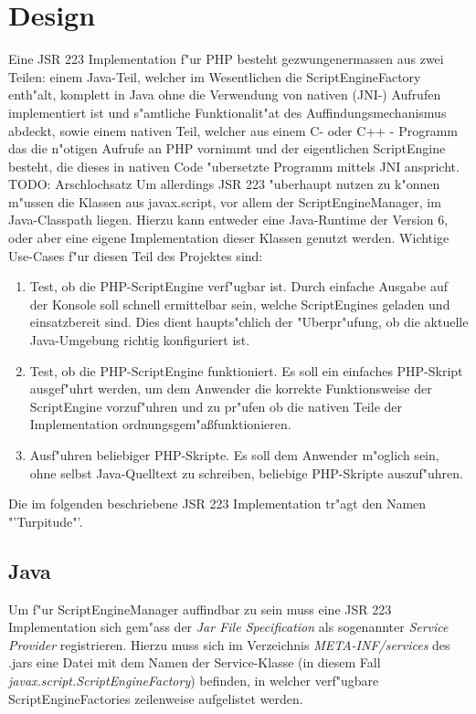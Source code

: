 \section{Design}
\label{sec:chap1:design}

Eine JSR 223 Implementation f"ur PHP besteht gezwungenermassen aus zwei Teilen: einem Java-Teil, welcher im Wesentlichen
die ScriptEngineFactory enth"alt, komplett in Java ohne die Verwendung von nativen (JNI-) Aufrufen implementiert ist und
s"amtliche Funktionalit"at des Auffindungsmechanismus abdeckt, sowie einem nativen Teil, welcher aus 
einem C- oder C++ - Programm das die n"otigen Aufrufe an PHP vornimmt und der eigentlichen ScriptEngine besteht, die dieses in
nativen Code "ubersetzte Programm mittels JNI anspricht. TODO: Arschlochsatz
Um allerdings JSR 223 "uberhaupt nutzen zu k"onnen m"ussen die Klassen aus javax.script, vor allem der ScriptEngineManager, 
im Java-Classpath liegen. Hierzu kann entweder eine Java-Runtime der Version 6, oder aber eine eigene Implementation dieser
Klassen genutzt werden. Wichtige Use-Cases f"ur diesen Teil des Projektes sind:
\begin{enumerate}
\item Test, ob die PHP-ScriptEngine verf"ugbar ist. Durch einfache Ausgabe auf der Konsole soll schnell ermittelbar sein, welche
    ScriptEngines geladen und einsatzbereit sind. Dies dient haupts"chlich der "Uberpr"ufung, ob die aktuelle Java-Umgebung
    richtig konfiguriert ist.
\item Test, ob die PHP-ScriptEngine funktioniert. Es soll ein einfaches PHP-Skript ausgef"uhrt werden, um dem Anwender
    die korrekte Funktionsweise der ScriptEngine vorzuf"uhren und zu pr"ufen ob die nativen Teile der Implementation
    ordnungsgem"a\ss funktionieren.
\item Ausf"uhren beliebiger PHP-Skripte. Es soll dem Anwender m"oglich sein, ohne selbst Java-Quelltext zu schreiben, beliebige
    PHP-Skripte auszuf"uhren.
\end{enumerate}
Die im folgenden beschriebene JSR 223 Implementation tr"agt den Namen "'Turpitude"'.

\subsection{Java}
\label{sec:chap1:design:java}

Um f"ur ScriptEngineManager auffindbar zu sein muss eine JSR 223 Implementation sich gem"ass der \emph{Jar File Specification} \cite{JARSPEC} 
als sogenannter \emph{Service Provider} registrieren. Hierzu muss sich im Verzeichnis \emph{META-INF/services} des .jars eine Datei
mit dem Namen der Service-Klasse (in diesem Fall \emph{javax.script.ScriptEngineFactory}) befinden, in welcher verf"ugbare 
ScriptEngineFactories zeilenweise aufgelistet werden.

